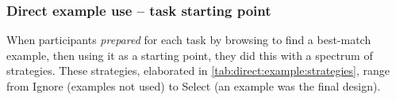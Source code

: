 
%

\subsubsection{Direct example use -- task starting point}
    
        
   When participants \emph{prepared} for each task by browsing to find a best-match example, then using it as a starting point, they did this with a spectrum of strategies. These strategies, elaborated in \autoref{tab:direct:example:strategies}, range from Ignore (examples not used) to Select (an example was the final design). 

